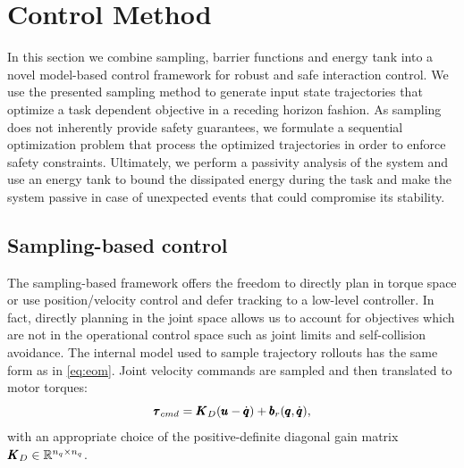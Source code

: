 \section{Control Method} \label{sec:control_method}

In this section we combine sampling, barrier functions and energy tank into a novel model-based control framework for robust and safe interaction control. We use the presented sampling method to generate input state trajectories that optimize a task dependent objective in a receding horizon fashion. As sampling does not inherently provide safety guarantees, we formulate a sequential optimization problem that process the optimized trajectories in order to enforce safety constraints. Ultimately, we perform a passivity analysis of the system and use an energy tank to bound the dissipated energy during the task and make the system passive in case of unexpected events that could compromise its stability.

\subsection{Sampling-based control}
The sampling-based framework offers the freedom to directly plan in torque space or use position/velocity control and defer tracking to a low-level controller. In fact, directly planning in the joint space allows us to account for objectives which are not in the operational control space such as joint limits and self-collision avoidance. The internal model used to sample trajectory rollouts has the same form as in \eqref{eq:eom}. Joint velocity commands are sampled and then translated to motor torques:
\begin{equation}
    \pmb{\tau}_{cmd} = \pmb{K}_{D} (\pmb{u} - \dot{\pmb{q}}) + \pmb{b}_{r}(\pmb{q}, \dot{\pmb{q}}),
\end{equation}
with an appropriate choice of the positive-definite diagonal gain matrix $\pmb{K}_{D} \in \mathbb{R}^{n_q\times n_q}$. 

